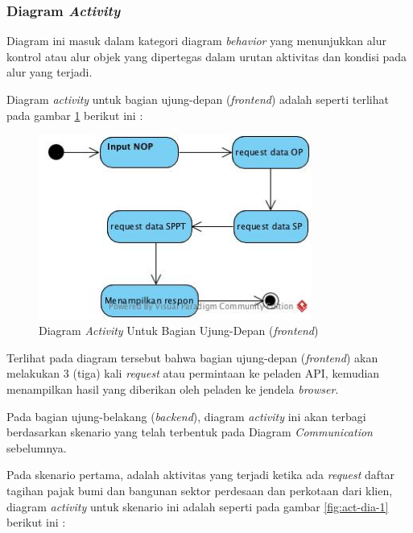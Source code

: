 \documentclass[pdftex,12pt, oneside]{article}
\begin{document}
\subsubsection{Diagram \textit{Activity}}

Diagram ini masuk dalam kategori diagram \textit{behavior} yang menunjukkan alur kontrol atau alur objek yang dipertegas dalam urutan aktivitas dan kondisi pada alur yang terjadi. 

Diagram \textit{activity} untuk bagian ujung-depan (\textit{frontend}) adalah seperti terlihat pada gambar \ref{fig:act-dia-fe} berikut ini :

\begin{figure}[H]
	\centering
	\includegraphics[width=0.8\textwidth]{./resources/act-dia-fe}
	\caption{Diagram \textit{Activity} Untuk Bagian Ujung-Depan (\textit{frontend})}
	\label{fig:act-dia-fe}
\end{figure}

Terlihat pada diagram tersebut bahwa bagian ujung-depan (\textit{frontend}) akan melakukan 3 (tiga) kali \textit{request} atau permintaan ke peladen API, kemudian menampilkan hasil yang diberikan oleh peladen ke jendela \textit{browser}.

Pada bagian ujung-belakang (\textit{backend}), diagram \textit{activity} ini akan terbagi berdasarkan skenario yang telah terbentuk pada Diagram \textit{Communication} sebelumnya.

Pada skenario pertama, adalah aktivitas yang terjadi ketika ada \textit{request} daftar tagihan pajak bumi dan bangunan sektor perdesaan dan perkotaan dari klien, diagram \textit{activity} untuk skenario ini adalah seperti pada gambar \ref{fig:act-dia-1} berikut ini :
\end{document}
